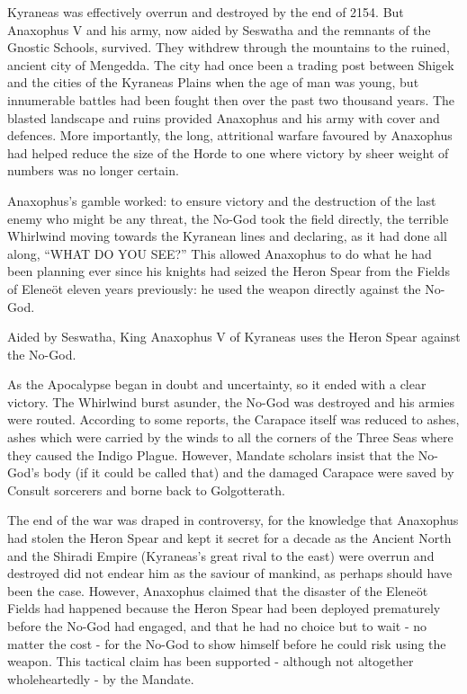 \documentclass[]{book}
\begin{document}
Kyraneas was effectively overrun and destroyed by the end of 2154. But Anaxophus V
and his army, now aided by Seswatha and the remnants of the Gnostic Schools,
survived. They withdrew through the mountains to the ruined, ancient city of
Mengedda. The city had once been a trading post between Shigek and the cities of the
Kyraneas Plains when the age of man was young, but innumerable battles had been
fought then over the past two thousand years. The blasted landscape and ruins
provided Anaxophus and his army with cover and defences. More importantly, the
long, attritional warfare favoured by Anaxophus had helped reduce the size of the
Horde to one where victory by sheer weight of numbers was no longer certain.

Anaxophus's gamble worked: to ensure victory and the destruction of the last enemy
who might be any threat, the No-God took the field directly, the terrible Whirlwind
moving towards the Kyranean lines and declaring, as it had done all along, ``WHAT
DO YOU SEE?'' This allowed Anaxophus to do what he had been planning ever since
his knights had seized the Heron Spear from the Fields of Eleneöt eleven years
previously: he used the weapon directly against the No-God.

Aided by Seswatha, King Anaxophus V of Kyraneas uses the Heron Spear against the No-God.

As the Apocalypse began in doubt and uncertainty, so it ended with a clear victory. The
Whirlwind burst asunder, the No-God was destroyed and his armies were routed.
According to some reports, the Carapace itself was reduced to ashes, ashes which were
carried by the winds to all the corners of the Three Seas where they caused the Indigo
Plague. However, Mandate scholars insist that the No-God's body (if it could be called
that) and the damaged Carapace were saved by Consult sorcerers and borne back to
Golgotterath.

The end of the war was draped in controversy, for the knowledge that Anaxophus had
stolen the Heron Spear and kept it secret for a decade as the Ancient North and the
Shiradi Empire (Kyraneas's great rival to the east) were overrun and destroyed did not
endear him as the saviour of mankind, as perhaps should have been the case. However,
Anaxophus claimed that the disaster of the Eleneöt Fields had happened because the
Heron Spear had been deployed prematurely before the No-God had engaged, and that
he had no choice but to wait - no matter the cost - for the No-God to show himself
before he could risk using the weapon. This tactical claim has been supported -
although not altogether wholeheartedly - by the Mandate.
\end{document}
